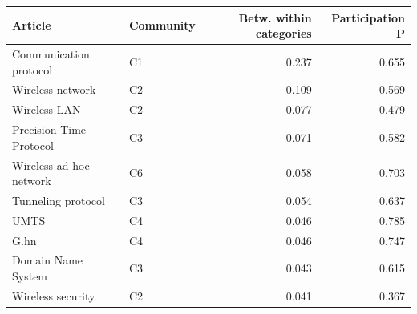 
\begin{tabular}{llrr}
\toprule
Article & Community & Betw. within categories & Participation P\\
\midrule
Communication protocol & C1 & 0.237 & 0.655\\
Wireless network & C2 & 0.109 & 0.569\\
Wireless LAN & C2 & 0.077 & 0.479\\
Precision Time Protocol & C3 & 0.071 & 0.582\\
Wireless ad hoc network & C6 & 0.058 & 0.703\\
Tunneling protocol & C3 & 0.054 & 0.637\\
UMTS & C4 & 0.046 & 0.785\\
G.hn & C4 & 0.046 & 0.747\\
Domain Name System & C3 & 0.043 & 0.615\\
Wireless security & C2 & 0.041 & 0.367\\
\bottomrule
\end{tabular}
